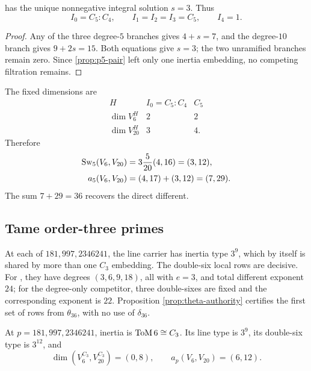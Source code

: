 \begin{proposition}[The \(p=5\) filtration]
\label{prop:p5-filtration}
 has the unique nonnegative integral
solution $s=3$.  Thus
\[
 I_0=C_5:C_4,\qquad I_1=I_2=I_3=C_5,\qquad I_4=1.
\]
\end{proposition}

\begin{proof}
Any of the three degree-$5$ branches gives $4+s=7$, and the degree-$10$
branch gives $9+2s=15$.  Both equations give $s=3$; the two unramified
branches remain zero.  Since \cref{prop:p5-pair} left only one inertia
embedding, no competing filtration remains.
\end{proof}

The fixed dimensions are
\begin{equation}
\begin{array}{c|cc}
H&I_0=C_5:C_4&C_5\\ \hline
\dim V_6^H&2&2\\
\dim V_{20}^H&3&4.
\end{array}
\label{eq:p5-fixed-dimensions}
\end{equation}
Therefore
\begin{align}
 \operatorname{Sw}_5(V_6,V_{20})
 &=3\frac5{20}(4,16)=(3,12),\label{eq:p5-swan}\\
 a_5(V_6,V_{20})&=(4,17)+(3,12)=(7,29).
\label{eq:p5-artin}
\end{align}
The sum $7+29=36$ recovers the direct different.

\subsection{Tame order-three primes}

At each of $181,997,2346241$, the line carrier has inertia type $3^9$,
which by itself is shared by more than one $C_3$ embedding.  The double-six
local rows are decisive.  For , they have degrees $(3,6,9,18)$, all
with $e=3$, and total different exponent $24$; for the degree-only
competitor, three double-sixes are fixed and the corresponding exponent is
$22$.  Proposition \ref{prop:theta-authority} certifies the first set of
rows from $\theta_{36}$, with no use of $\delta_{36}$.

\begin{proposition}
\label{prop:tame-c3}
At $p=181,997,2346241$, inertia is $\mathrm{ToM}\,6\cong C_3$.  Its line type is
$3^9$, its double-six type is $3^{12}$, and
\[
 \dim(V_6^{C_3},V_{20}^{C_3})=(0,8),\qquad
 a_p(V_6,V_{20})=(6,12).
\]
\end{proposition}

